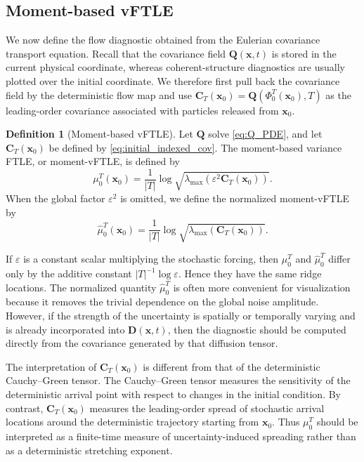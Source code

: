 \documentclass[a4paper,11pt]{article}
\numberwithin{equation}{section}
\theoremstyle{plain}
\theoremstyle{definition}
\newtheorem{definition}[theorem]{Definition}
\theoremstyle{remark}
\newcommand{\bx}{\mathbf{x}}
\newcommand{\bC}{\mathbf{C}}
\newcommand{\bD}{\mathbf{D}}
\newcommand{\bQ}{\mathbf{Q}}
\newcommand{\lmax}{\lambda_{\max}}
\newcommand{\flow}[2]{\Phi_{#1}^{#2}}
\begin{document}
\subsection{Moment-based vFTLE}

We now define the flow diagnostic obtained from the Eulerian covariance transport equation.  Recall that the covariance field \(\bQ(\bx,t)\) is stored in the current physical coordinate, whereas coherent-structure diagnostics are usually plotted over the initial coordinate.  We therefore first pull back the covariance field by the deterministic flow map and use \(\bC_T(\bx_0)=\bQ(\flow{0}{T}(\bx_0),T)\) as the leading-order covariance associated with particles released from \(\bx_0\).

\begin{definition}[Moment-based vFTLE]
Let \(\bQ\) solve \eqref{eq:Q_PDE}, and let \(\bC_T(\bx_0)\) be defined by \eqref{eq:initial_indexed_cov}.  The moment-based variance FTLE, or moment-vFTLE, is defined by
\begin{equation}
    \mu_0^T(\bx_0)
    =
    \frac{1}{|T|}
    \log
    \sqrt{
    \lmax\!\left(\varepsilon^2\bC_T(\bx_0)\right)
    } .
    \label{eq:mvftle_def}
\end{equation}
When the global factor \(\varepsilon^2\) is omitted, we define the normalized moment-vFTLE by
\begin{equation}
    \widehat{\mu}_0^T(\bx_0)
    =
    \frac{1}{|T|}
    \log
    \sqrt{
    \lmax\!\left(\bC_T(\bx_0)\right)
    } .
    \label{eq:normalized_mvftle_def}
\end{equation}
\end{definition}

If \(\varepsilon\) is a constant scalar multiplying the stochastic forcing, then \(\mu_0^T\) and \(\widehat{\mu}_0^T\) differ only by the additive constant \(|T|^{-1}\log\varepsilon\).  Hence they have the same ridge locations.  The normalized quantity \(\widehat{\mu}_0^T\) is often more convenient for visualization because it removes the trivial dependence on the global noise amplitude.  However, if the strength of the uncertainty is spatially or temporally varying and is already incorporated into \(\bD(\bx,t)\), then the diagnostic should be computed directly from the covariance generated by that diffusion tensor.

The interpretation of \(\bC_T(\bx_0)\) is different from that of the deterministic Cauchy--Green tensor.  The Cauchy--Green tensor measures the sensitivity of the deterministic arrival point with respect to changes in the initial condition.  By contrast, \(\bC_T(\bx_0)\) measures the leading-order spread of stochastic arrival locations around the deterministic trajectory starting from \(\bx_0\).  Thus \(\mu_0^T\) should be interpreted as a finite-time measure of uncertainty-induced spreading rather than as a deterministic stretching exponent.
\end{document}

